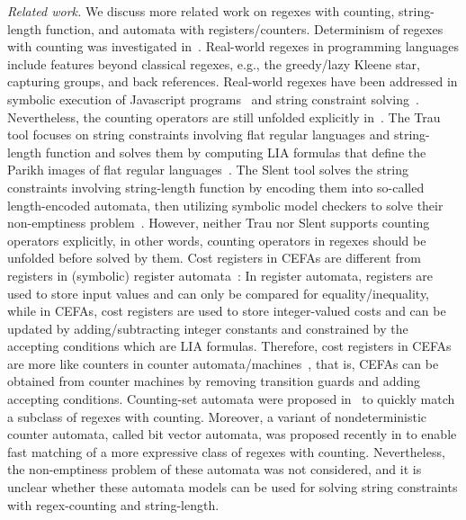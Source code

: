\begin{itemize}
%
\end{itemize}

\medskip
\noindent
\emph{Related work.} 
We discuss more related work on regexes with counting, string-length function, and automata with registers/counters.  
%
Determinism of regexes with counting was investigated in~\cite{GGM12,CL15}. 
%
Real-world regexes in programming languages include features beyond classical regexes, e.g., the greedy/lazy Kleene star, capturing groups, and back references. Real-world regexes have been addressed in symbolic execution of Javascript programs~\cite{LMK19} and string constraint solving~\cite{CF+22}. 
Nevertheless, the counting operators are still unfolded explicitly in~\cite{CF+22}. 
%
The Trau tool focuses on string constraints involving flat regular languages and string-length function and solves them by computing LIA formulas that define the Parikh images of flat regular languages~\cite{z3trau}. The Slent tool solves the string constraints involving string-length function by encoding them into so-called length-encoded automata, then utilizing symbolic model checkers to solve their non-emptiness problem~\cite{WC+18}. However, neither Trau nor Slent supports counting operators explicitly, in other words, counting operators in regexes should be unfolded before solved by them.
%
Cost registers in CEFAs are different from registers in (symbolic) register automata~\cite{ra,sra}:  In register automata, registers are used to store input values and can only be compared for equality/inequality, while in CEFAs, cost registers are used to store integer-valued costs and can be updated by adding/subtracting integer constants and constrained by the accepting conditions which are LIA formulas.
%
Therefore, cost registers in CEFAs are more like counters in counter automata/machines~\cite{Minsky67}, that is, CEFAs can be obtained from counter machines by removing transition guards and adding accepting conditions. 
%
%
Counting-set automata were proposed in~\cite{redos_lenka,HS+23} to quickly match a subclass of regexes with counting. Moreover, a variant of nondeterministic counter automata, called bit vector automata, was proposed recently in \cite{GKM23} to enable fast matching of a more expressive class of regexes with counting.   Nevertheless, the non-emptiness problem of these automata was not considered, and it is unclear whether these automata models can be used for solving string constraints with regex-counting and string-length. 

